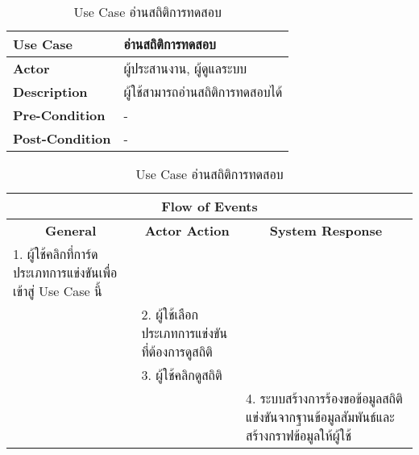 \begin{table}[H]
    \caption{Use Case อ่านสถิติการทดสอบ}
    \label{tab:usecase-read-stats}
    \begin{tabularx}{\textwidth}{ | p{3cm} | X | }
    \hline
    \textbf{Use Case} & อ่านสถิติการทดสอบ \\
    \hline
    \textbf{Actor} & ผู้ประสานงาน, ผู้ดูแลระบบ \\
    \hline
    \textbf{Description} & ผู้ใช้สามารถอ่านสถิติการทดสอบได้ \\
    \hline
    \textbf{Pre-Condition} & - \\
    \hline
    \textbf{Post-Condition} & - \\
    \hline
    \end{tabularx}
    \begin{tabularx}{\textwidth}{ | X | X | X | }
    \multicolumn{3}{|c|}{\textbf{Flow of Events}} \\
    \hline
    \multicolumn{1}{|c|}{\textbf{General}} & \multicolumn{1}{|c|}{\textbf{Actor Action}} & \multicolumn{1}{|c|}{\textbf{System Response}} \\
    \hline
    1. ผู้ใช้คลิกที่การ์ดประเภทการแข่งขันเพื่อเข้าสู่ Use Case นี้ &  &  \\
    \hline
    & 2. ผู้ใช้เลือกประเภทการแข่งขันที่ต้องการดูสถิติ & \\
    \hline
    & 3. ผู้ใช้คลิกดูสถิติ & \\
    \hline
    & & 4. ระบบสร้างการร้องขอข้อมูลสถิติแข่งขันจากฐานข้อมูลสัมพันธ์และสร้างกราฟข้อมูลให้ผู้ใช้ \\
    \hline
    \end{tabularx}
\end{table}
